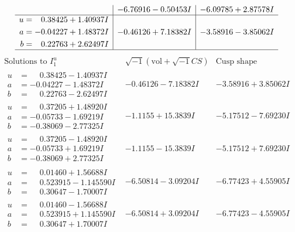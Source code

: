\documentclass[1p]{elsarticle_modified}
\theoremstyle{definition}
\newcommand{\I}{\sqrt{-1}}
\begin{document}
$$\begin{array}{c|c|c}
 & -6.76916 - 0.50453 I & -6.09785 + 2.87578 I \\ \hline\begin{aligned}
u &= \phantom{-}0.38425 + 1.40937 I \\
a &= -0.04227 + 1.48372 I \\
b &= \phantom{-}0.22763 + 2.62497 I\end{aligned}
 & -0.46126 + 7.18382 I & -3.58916 - 3.85062 I\\
 \hline 
 \end{array}$$\newpage$$\begin{array}{c|c|c}  
\text{Solutions to }I^u_{1}& \I (\text{vol} + \sqrt{-1}CS) & \text{Cusp shape}\\
 \hline 
\begin{aligned}
u &= \phantom{-}0.38425 - 1.40937 I \\
a &= -0.04227 - 1.48372 I \\
b &= \phantom{-}0.22763 - 2.62497 I\end{aligned}
 & -0.46126 - 7.18382 I & -3.58916 + 3.85062 I \\ \hline\begin{aligned}
u &= \phantom{-}0.37205 + 1.48920 I \\
a &= -0.05733 - 1.69219 I \\
b &= -0.38069 - 2.77325 I\end{aligned}
 & -1.1155 + 15.3839 I & -5.17512 - 7.69230 I \\ \hline\begin{aligned}
u &= \phantom{-}0.37205 - 1.48920 I \\
a &= -0.05733 + 1.69219 I \\
b &= -0.38069 + 2.77325 I\end{aligned}
 & -1.1155 - 15.3839 I & -5.17512 + 7.69230 I \\ \hline\begin{aligned}
u &= \phantom{-}0.01460 + 1.56688 I \\
a &= \phantom{-}0.523915 - 1.145590 I \\
b &= \phantom{-}0.30647 - 1.70007 I\end{aligned}
 & -6.50814 - 3.09204 I & -6.77423 + 4.55905 I \\ \hline\begin{aligned}
u &= \phantom{-}0.01460 - 1.56688 I \\
a &= \phantom{-}0.523915 + 1.145590 I \\
b &= \phantom{-}0.30647 + 1.70007 I\end{aligned}
 & -6.50814 + 3.09204 I & -6.77423 - 4.55905 I \\ \hline\begin{aligned}

\end{aligned}
\end{array}$$
\end{document}
